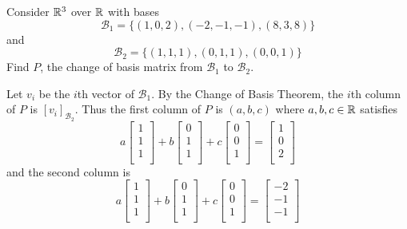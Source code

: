 \documentclass{article}
\begin{document}
\begin{example}
  Consider $\mathbb{R}^3$ over $\mathbb{R}$ with bases
  \[
    \mathcal{B}_1 = \{(1, 0, 2), (-2, -1, -1), (8, 3, 8)\}
  \] and \[
    \mathcal{B}_2 = \{(1, 1, 1), (0, 1, 1), (0, 0, 1)\}
  \]
  Find $P$, the change of basis matrix from $\mathcal{B}_1$ to $\mathcal{B}_2$.

  Let $v_i$ be the $i$th vector of $\mathcal{B}_1$. By the Change of Basis Theorem, the $i$th column of $P$ is $[v_i]_{\mathcal{B}_2}$. Thus the first column of $P$ is $(a, b, c)$ where $a, b, c \in \mathbb{R}$ satisfies \[
    a
    \begin{bmatrix}
      1 \\1\\1\\
    \end{bmatrix}+b
    \begin{bmatrix}
      0 \\1\\1\\
    \end{bmatrix} + c
    \begin{bmatrix}
      0 \\0\\1\\
    \end{bmatrix} =
    \begin{bmatrix}
      1 \\0\\2\\
    \end{bmatrix}
  \] and the second column is \[
    a
    \begin{bmatrix}
      1 \\1\\1\\
    \end{bmatrix}+b
    \begin{bmatrix}
      0 \\1\\1\\
    \end{bmatrix} + c
    \begin{bmatrix}
      0 \\0\\1\\
    \end{bmatrix} =
    \begin{bmatrix}
      -2 \\-1\\-1\\

\end{bmatrix}\]
\end{example}
\end{document}
